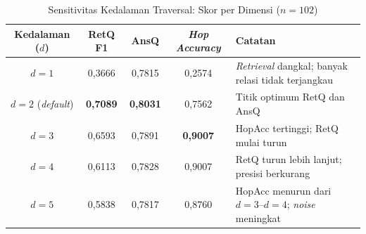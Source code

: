 \renewcommand{\arraystretch}{1.3}
\captionsetup[table]{justification=raggedright,singlelinecheck=false}
\begin{table}[H]
\caption{Sensitivitas Kedalaman Traversal: Skor per Dimensi ($n{=}102$)}
\label{tbl:depth_sensitivity}
\centering
\begin{tabular}{| c | c | c | c | p{} |}
\hline
\textbf{Kedalaman ($d$)} & \textbf{RetQ F1} & \textbf{AnsQ} & \textbf{\textit{Hop Accuracy}} & \textbf{Catatan} \\
\hline
$d=1$ & 0,3666 & 0,7815 & 0,2574 & \textit{Retrieval} dangkal; banyak relasi tidak terjangkau \\
\hline
$d=2$ (\textit{default}) & \textbf{0,7089} & \textbf{0,8031} & 0,7562 & Titik optimum RetQ dan AnsQ \\
\hline
$d=3$ & 0,6593 & 0,7891 & \textbf{0,9007} & HopAcc tertinggi; RetQ mulai turun \\
\hline
$d=4$ & 0,6113 & 0,7828 & 0,9007 & RetQ turun lebih lanjut; presisi berkurang \\
\hline
$d=5$ & 0,5838 & 0,7817 & 0,8760 & HopAcc menurun dari $d=3$--$d=4$; \textit{noise} meningkat \\
\hline
\end{tabular}
\end{table}
